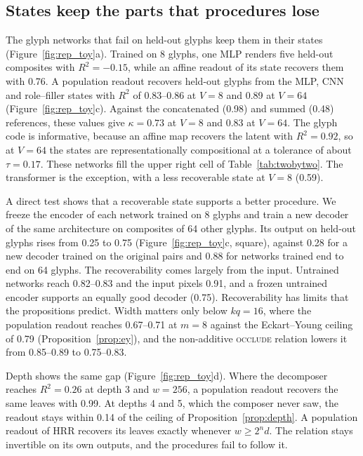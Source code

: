 \documentclass[10pt]{article}
\theoremstyle{plain}
\theoremstyle{remark}
\begin{document}
\subsection{States keep the parts that procedures lose}
\label{sec:states}

The glyph networks that fail on held-out glyphs keep them in their states (Figure~\ref{fig:rep_toy}a). Trained on 8 glyphs, one MLP renders five held-out composites with $R^2 = -0.15$, while an affine readout of its state recovers them with 0.76. A population readout recovers held-out glyphs from the MLP, CNN and role--filler states with $R^2$ of 0.83--0.86 at $V = 8$ and 0.89 at $V = 64$ (Figure~\ref{fig:rep_toy}c). Against the concatenated (0.98) and summed (0.48) references, these values give $\kappa = 0.73$ at $V = 8$ and $0.83$ at $V = 64$. The glyph code is informative, because an affine map recovers the latent with $R^2 = 0.92$, so at $V = 64$ the states are representationally compositional at a tolerance of about $\tau = 0.17$. These networks fill the upper right cell of Table~\ref{tab:twobytwo}. The transformer is the exception, with a less recoverable state at $V = 8$ (0.59).

A direct test shows that a recoverable state supports a better procedure. We freeze the encoder of each network trained on 8 glyphs and train a new decoder of the same architecture on composites of 64 other glyphs. Its output on held-out glyphs rises from 0.25 to 0.75 (Figure~\ref{fig:rep_toy}c, square), against 0.28 for a new decoder trained on the original pairs and 0.88 for networks trained end to end on 64 glyphs. The recoverability comes largely from the input. Untrained networks reach 0.82--0.83 and the input pixels 0.91, and a frozen untrained encoder supports an equally good decoder (0.75). Recoverability has limits that the propositions predict. Width matters only below $kq = 16$, where the population readout reaches 0.67--0.71 at $m = 8$ against the Eckart--Young ceiling of 0.79 (Proposition~\ref{prop:ey}), and the non-additive \textsc{occlude} relation lowers it from 0.85--0.89 to 0.75--0.83.

Depth shows the same gap (Figure~\ref{fig:rep_toy}d). Where the decomposer reaches $R^2 = 0.26$ at depth 3 and $w = 256$, a population readout recovers the same leaves with 0.99. At depths 4 and 5, which the composer never saw, the readout stays within 0.14 of the ceiling of Proposition~\ref{prop:depth}. A population readout of HRR recovers its leaves exactly whenever $w \ge 2^n d$. The relation stays invertible on its own outputs, and the procedures fail to follow it.
\end{document}
